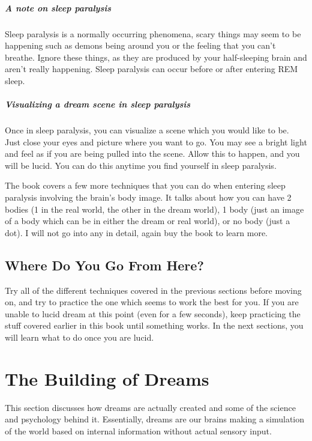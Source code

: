 \documentclass{book}
\begin{document}
\paragraph{A note on sleep paralysis} Sleep paralysis is a normally occurring phenomena, scary things may seem to be happening such as demons being around you or the feeling that you can't breathe. Ignore these things, as they are produced by your half-sleeping brain and aren't really happening. Sleep paralysis can occur before or after entering REM sleep.

\paragraph{Visualizing a dream scene in sleep paralysis} Once in sleep paralysis, you can visualize a scene which you would like to be. Just close your eyes and picture where you want to go. You may see a bright light and feel as if you are being pulled into the scene. Allow this to happen, and you will be lucid. You can do this anytime you find yourself in sleep paralysis. 

\bigskip\noindent
The book covers a few more techniques that you can do when entering sleep paralysis involving the brain's body image. It talks about how you can have 2 bodies (1 in the real world, the other in the dream world), 1 body (just an image of a body which can be in either the dream or real world), or no body (just a dot). I will not go into any in detail, again buy the book to learn more. 

\section{Where Do You Go From Here?}
Try all of the different techniques covered in the previous sections before moving on, and try to practice the one which seems to work the best for you. If you are unable to lucid dream at this point (even for a few seconds), keep practicing the stuff covered earlier in this book until something works. In the next sections, you will learn what to do once you are lucid. 


\chapter{The Building of Dreams}
This section discusses how dreams are actually created and some of the science and psychology behind it. Essentially, dreams are our brains making a simulation of the world based on internal information without actual sensory input.
\end{document}
